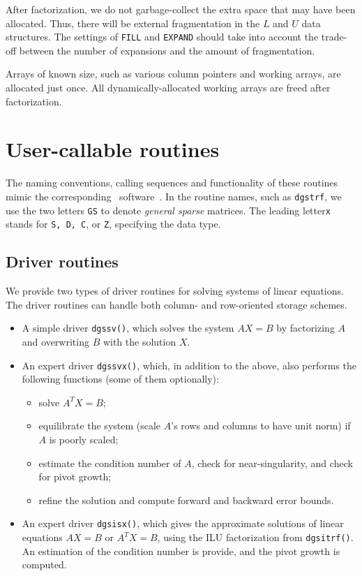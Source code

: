 After factorization, we do not garbage-collect the extra space that
may have been allocated. Thus, there will be external fragmentation in
the $L$ and $U$ data structures. The settings of {\tt FILL} and {\tt EXPAND} 
should take into account the trade-off between the number of expansions 
and the amount of fragmentation.

Arrays of known size, such as various column pointers and working arrays, 
are allocated just once. All dynamically-allocated working arrays are freed
after factorization.


\section{User-callable routines}
\label{sec:routine}

The naming conventions, calling sequences and functionality of
these routines mimic the corresponding \LAPACK\ software~\cite{lapackmanual2}.
In the routine names, such as {\tt dgstrf}, we use the two letters
{\tt GS} to denote {\em general sparse} matrices. The leading
letter{\tt x} stands for {\tt S, D, C}, or {\tt Z}, specifying the data type.


\subsection{Driver routines}
We provide two types of driver routines for solving systems of 
linear equations. The driver routines can handle both column-
and row-oriented storage schemes.
\begin{itemize}
\item A simple driver {\tt dgssv()}, which solves the system $AX=B$ by 
      factorizing $A$ and overwriting $B$ with the solution $X$. 
\item An expert driver {\tt dgssvx()}, which, in addition to the above, also 
      performs the following functions (some of them optionally):
      \begin{itemize}
      \item solve $A^TX=B$;
      \item equilibrate the system (scale $A$'s rows and columns to have
		unit norm) if $A$ is poorly scaled;
      \item estimate the condition number of $A$, check for near-singularity,
            and check for pivot growth;
      \item refine the solution and compute forward and backward error bounds.
      \end{itemize}
\item An expert driver {\tt dgsisx()}, which gives the approximate
  solutions of linear equations $AX=B$ or $A^TX=B$, using the ILU
  factorization from {\tt dgsitrf()}. An estimation of the condition
  number is provide, and the pivot growth is computed.
\end{itemize}

